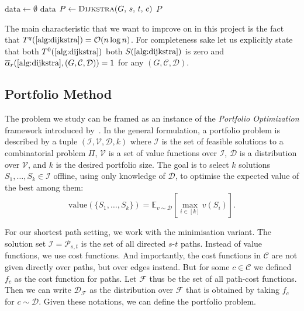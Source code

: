 \begin{algorithm}[H]
\caption{Stateless Dijkstra Algorithm, solving  optimally.}
\label{alg:dijkstra}
\begin{algorithmic}[1]
    \State $\text{data} \gets \emptyset$
    \State \Return $\text{data}$
\EndProcedure
\Statex
{}
    \State $P \gets \textsc{Dijkstra}(G,\, s,\, t,\, c)$
    \State \Return $P$
\EndProcedure
\end{algorithmic}
\end{algorithm}

The main characteristic that we want to improve on in this project is the fact that $T^q(\text{\Cref{alg:dijkstra}}) = \mathcal O(n \log n)$. For completeness sake let us explicitly state that both $T^0(\text{\Cref{alg:dijkstra}})$ both $S(\text{\Cref{alg:dijkstra}})$ is zero and $\overline\alpha_r (\text{\Cref{alg:dijkstra}}, (G, \mathcal C, \mathcal D)) = 1$ for any $(G, \mathcal C, \mathcal D)$.

\subsection{Portfolio Method}

The problem we study can be framed as an instance of the \emph{Portfolio Optimization} framework introduced by~\cite{miltos}. In the general formulation, a portfolio problem is described by a tuple $(\mathcal I, \mathcal V, \mathcal D, k)$ where $\mathcal I$ is the set of feasible solutions to a combinatorial problem $\Pi$, $\mathcal V$ is a set of value functions over $\mathcal I$, $\mathcal D$ is a distribution over $\mathcal V$, and $k$ is the desired portfolio size. The goal is to select $k$ solutions $S_1,\dots,S_k \in \mathcal I$ offline, using only knowledge of $\mathcal D$, to optimise the expected value of the best among them:
\[
\text{value}(\{S_1,\dots,S_k\}) = \mathbb{E}_{v \sim \mathcal D}\left[\max_{i \in [k]} v(S_i)\right].
\]

For our shortest path setting, we work with the minimisation variant. The solution set $\mathcal I = \mathcal{P}_{s,t}$ is the set of all directed $s$-$t$ paths. Instead of value functions, we use cost functions. And importantly, the cost functions in $\mathcal C$ are not given directly over paths, but over edges instead. But for some $c \in \mathcal C$ we defined $f_c$ as the cost function for paths. Let $\mathcal F$ thus be the set of all path-cost functions. Then we can write $\mathcal D_{\mathcal F}$ as the distribution over $\mathcal F$ that is obtained by taking $f_c$ for $c \sim \mathcal D$. Given these notations, we can define the portfolio problem.

